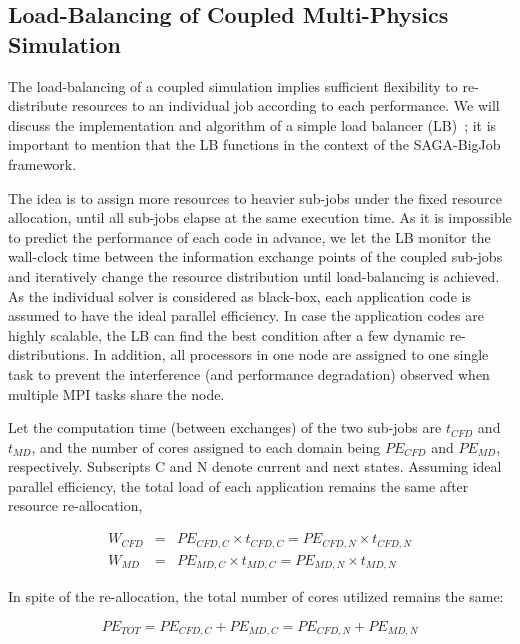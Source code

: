 \documentclass[preprint,12pt]{elsarticle}
\begin{document}
\subsection{Load-Balancing of Coupled Multi-Physics Simulation}
\label{sec:computational_LoadBalancing}
The load-balancing of a coupled simulation implies sufficient flexibility to re-distribute resources to an individual job according to each performance. We will discuss the implementation and algorithm of a simple load balancer (LB)~\cite{Ko}; it is important to mention that the LB functions in the context of the SAGA-BigJob framework.

The idea is to assign more resources to heavier sub-jobs under the fixed resource allocation, until all sub-jobs elapse at the same execution time. As it is impossible to predict the performance of each code in advance, we let the LB monitor the wall-clock time between the information exchange points of the coupled sub-jobs and iteratively change the resource distribution until load-balancing is achieved. As the individual solver is considered as black-box, each application code is assumed to have the ideal parallel efficiency. In case the application codes are highly scalable, the LB can find the best condition after a few dynamic re-distributions. In addition, all processors in one node are assigned to one single task to prevent the interference (and performance degradation) observed when multiple MPI tasks share the node.

Let the computation time (between exchanges) of the two sub-jobs are $t_{CFD}$ and $t_{MD}$, and the number of cores assigned to each domain being $PE_{CFD}$ and $PE_{MD}$, respectively. Subscripts C and N denote current and next states. Assuming ideal parallel efficiency, the total load of each application remains the same after resource re-allocation,


\vspace{-.2em}
\footnotesize
\begin{eqnarray}
W_{CFD}&=&PE_{CFD,C}\times t_{CFD,C}=PE_{CFD,N}\times t_{CFD,N} \nonumber \\
W_{MD}&=&PE_{MD,C}\times t_{MD,C}=PE_{MD,N}\times t_{MD,N}
\label{eq:SimTime_EachTask}
\end{eqnarray}
\normalsize


In spite of the re-allocation, the total number of cores utilized remains the same:


\vspace{-.2em}
\footnotesize
\begin{equation}
PE_{TOT}=PE_{CFD,C}+PE_{MD,C}=PE_{CFD,N}+PE_{MD,N}
\label{eq:PECondition}
\end{equation}
\normalsize
\end{document}

